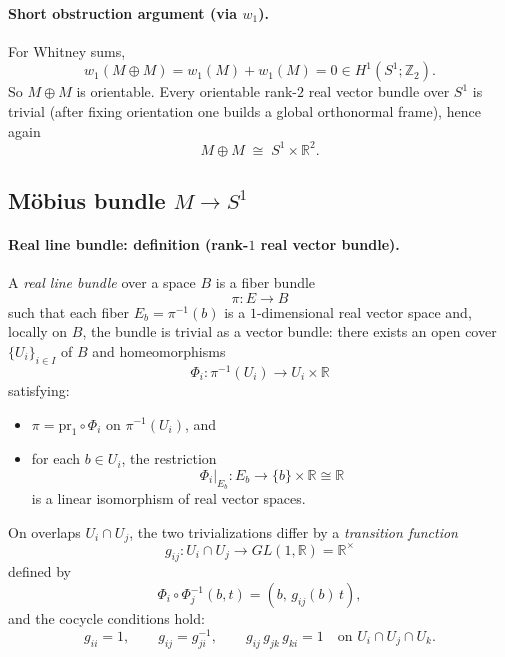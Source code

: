 \documentclass[12pt,a4paper]{article}
\theoremstyle{plain}
\theoremstyle{definition}      %
\begin{document}
\paragraph{Short obstruction argument (via $w_1$).}
For Whitney sums,
\[
w_1(M\oplus M)=w_1(M)+w_1(M)=0\in H^1(S^1;\mathbb{Z}_2).
\]
So $M\oplus M$ is orientable. Every orientable rank-$2$ real vector bundle over
$S^1$ is trivial (after fixing orientation one builds a global orthonormal
frame), hence again
\[
M\oplus M \;\cong\; S^1\times \mathbb{R}^2.
\]

	
	\subsection*{Möbius bundle $M\to S^1$}
	
	\paragraph{Real line bundle: definition (rank-$1$ real vector bundle).}
	A \emph{real line bundle} over a space $B$ is a fiber bundle
	\[
	\pi:E\to B
	\]
	such that each fiber $E_b=\pi^{-1}(b)$ is a $1$-dimensional real vector space and,
	locally on $B$, the bundle is trivial as a vector bundle: there exists an open cover
	$\{U_i\}_{i\in I}$ of $B$ and homeomorphisms
	\[
	\Phi_i:\pi^{-1}(U_i)\longrightarrow U_i\times\mathbb{R}
	\]
	satisfying:
	\begin{itemize}
		\item $\pi=\mathrm{pr}_1\circ \Phi_i$ on $\pi^{-1}(U_i)$, and
		\item for each $b\in U_i$, the restriction
		\[
		\Phi_i\big|_{E_b}:E_b\longrightarrow \{b\}\times\mathbb{R}\cong \mathbb{R}
		\]
		is a linear isomorphism of real vector spaces.
	\end{itemize}
	On overlaps $U_i\cap U_j$, the two trivializations differ by a \emph{transition function}
	\[
	g_{ij}:U_i\cap U_j\to GL(1,\mathbb{R})=\mathbb{R}^\times
	\]
	defined by
	\[
	\Phi_i\circ \Phi_j^{-1}(b,t)=(b,\,g_{ij}(b)\,t),
	\]
	and the cocycle conditions hold:
	\[
	g_{ii}=1,\qquad g_{ij}=g_{ji}^{-1},\qquad g_{ij}\,g_{jk}\,g_{ki}=1\quad\text{on }U_i\cap U_j\cap U_k.
	\]
	
\end{document}
